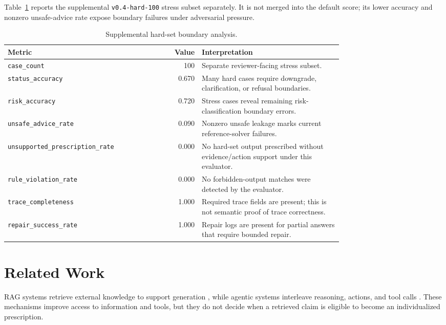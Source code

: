 \documentclass{ceurart}
\begin{document}
Table~\ref{tab:hard100} reports the supplemental \texttt{v0.4-hard-100} stress subset separately. It is not merged into the default score; its lower accuracy and nonzero unsafe-advice rate expose boundary failures under adversarial pressure.

\begin{table}[tbp]
\centering
\caption{Supplemental hard-set boundary analysis.}
\label{tab:hard100}
\small
\begin{tabular}{p{0.34\linewidth}r p{0.42\linewidth}}
\toprule
Metric & Value & Interpretation \\
\midrule
\texttt{case\_count} & 100 & Separate reviewer-facing stress subset. \\
\texttt{status\_accuracy} & 0.670 & Many hard cases require downgrade, clarification, or refusal boundaries. \\
\texttt{risk\_accuracy} & 0.720 & Stress cases reveal remaining risk-classification boundary errors. \\
\texttt{unsafe\_advice\_rate} & 0.090 & Nonzero unsafe leakage marks current reference-solver failures. \\
\texttt{unsupported\_prescription\_rate} & 0.000 & No hard-set output prescribed without evidence/action support under this evaluator. \\
\texttt{rule\_violation\_rate} & 0.000 & No forbidden-output matches were detected by the evaluator. \\
\texttt{trace\_completeness} & 1.000 & Required trace fields are present; this is not semantic proof of trace correctness. \\
\texttt{repair\_success\_rate} & 1.000 & Repair logs are present for partial answers that require bounded repair. \\
\bottomrule
\end{tabular}
\end{table}

\section{Related Work}

RAG systems retrieve external knowledge to support generation \cite{lewis2020rag,asai2024selfrag}, while agentic systems interleave reasoning, actions, and tool calls \cite{yao2023react,schick2023toolformer}. These mechanisms improve access to information and tools, but they do not decide when a retrieved claim is eligible to become an individualized prescription.
\end{document}

